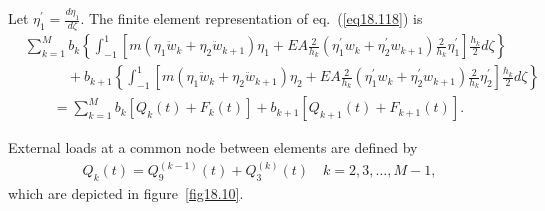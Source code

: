 \documentclass{AeroStructure-ERJohnson}
\begin{document}
Let $\eta_{1}^{\prime}=\frac{d \eta_{1}}{d \zeta}$. The finite element representation of eq.~(\ref{eq18.118}) is
\begin{align}\label{eq18.129}
&\sum_{k=1}^{M} b_{k}\left\{\int_{-1}^1\left[m\left(\eta_{1} \ddot{w}_{k}+\eta_{2} \ddot{w}_{k+1}\right) \eta_{1}+E A \frac{2}{h_{k}}\left(\eta_{1}^{\prime} w_{k}+\eta_{2}^{\prime} w_{k+1}\right) \frac{2}{h_{k}} \eta_{1}^{\prime}\right] \frac{h_{k}}{2} d \zeta\right\} \nonumber\\
&\quad\qquad+ b_{k+1}\left\{\int_{-1}^{1}\left[m\left(\eta_{1} \ddot{w}_{k}+\eta_{2} \ddot{w}_{k+1}\right) \eta_{2}+E A \frac{2}{h_{k}}\left(\eta_{1}^{\prime} w_{k}+\eta_{2}^{\prime} w_{k+1}\right) \frac{2}{h_{k}} \eta_{2}^{\prime}\right] \frac{h_{k}}{2} d \zeta\right\}\nonumber\\
&\qquad=\sum_{k=1}^{M} b_{k}\left[Q_{k}(t)+F_{k}(t)\right]+b_{k+1}\left[Q_{k+1}(t)+F_{k+1}(t)\right] .
\end{align}

\pagebreak

{\def\thefigure{18.9}
}

\noindent External loads at a common node between elements are defined by
\begin{align}
Q_{k}(t)=Q_{9}^{(k-1)}(t)+Q_{3}^{(k)}(t) \quad k=2,3, \ldots, M-1,\label{eq18.130}
\end{align}
which are depicted in figure~\ref{fig18.10}.

\vspace*{-12pt}

{\def\thefigure{18.10}
}

\vspace*{-12pt}
\end{document}
